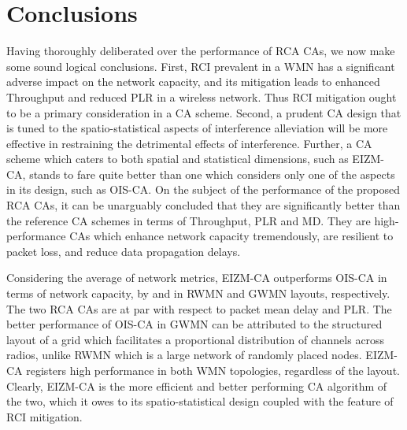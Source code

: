 \documentclass[conference]{IEEEtran}
\begin{document}
\section{Conclusions}
Having thoroughly deliberated over the performance of RCA CAs, we now make some sound logical conclusions. First, RCI prevalent in a WMN has a significant adverse impact on the network capacity, and its mitigation leads to enhanced Throughput and reduced PLR in a wireless network. Thus RCI mitigation ought to be a primary consideration in a CA scheme. Second, a prudent CA design that is tuned to the spatio-statistical aspects of interference alleviation will be more effective in restraining the detrimental effects of interference. Further, a CA scheme which caters to both spatial and statistical dimensions, such as EIZM-CA, stands to fare quite better than one which considers only one of the aspects in its design, such as OIS-CA. On the subject of the performance of the proposed RCA CAs, it can be unarguably concluded that they are significantly better than the reference CA schemes in terms of Throughput, PLR and MD. They are high-performance CAs which enhance network capacity tremendously, 
are 
resilient to packet loss, and reduce data propagation delays. 

Considering the average of network metrics, EIZM-CA outperforms OIS-CA in terms of network capacity, by  and  in RWMN and GWMN layouts, respectively. The two RCA CAs are at par with respect to packet mean delay and PLR. The better performance of OIS-CA in GWMN can be attributed to the structured layout of a grid which facilitates a proportional distribution of channels across radios, unlike RWMN which is a large network of randomly placed nodes. EIZM-CA registers high performance in both WMN topologies, regardless of the layout. Clearly, EIZM-CA is the more efficient and better performing CA algorithm of the two, which it owes to its spatio-statistical design coupled with the feature of RCI mitigation.





\end{document}
